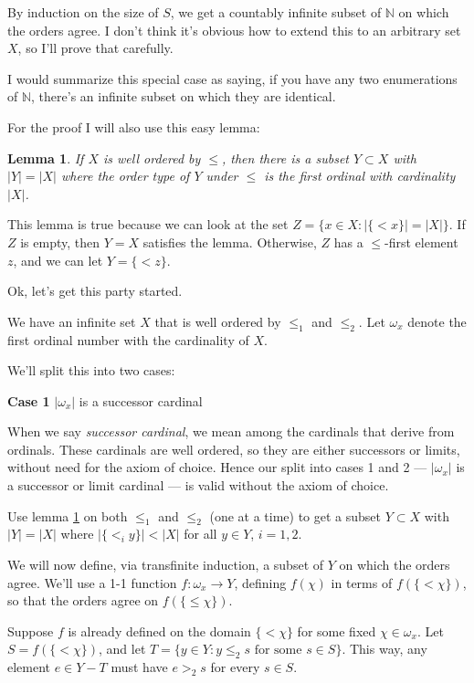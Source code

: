 \documentclass[11pt]{amsart}
\newtheorem{Lemma}[Def]{Lemma}
\newcommand\bpf[1][]{\smallskip\noindent{\bf Proof#1.}\quad}
\newcommand\N{\mathbb N}
\begin{document}
By induction on the size of $S$, we get a countably infinite subset of $\N$ on which the orders agree.
I don't think it's obvious how to extend this to an arbitrary set $X$, so I'll prove that carefully.

I would summarize this special case as saying, if you have any two enumerations of $\N$, there's
an infinite subset on which they are identical.

For the proof I will also use this easy lemma:

\begin{Lemma}\label{first_ordinal_lemma}
If $X$ is well ordered by $\le$, then there is a subset $Y\subset X$ with
$|Y| = |X|$ where the order type of $Y$ under $\le$ is the first ordinal
with cardinality $|X|$.
\end{Lemma}

This lemma is true because we can look at the set $Z = \{ x\in X : |\{ < x \}| = |X| \}$.
If $Z$ is empty, then $Y=X$ satisfies the lemma. Otherwise, $Z$ has a $\le$-first element $z$,
and we can let $Y = \{ < z \}$.

\bpf
Ok, let's get this party started.

We have an infinite set $X$ that is well ordered by $\le_1$ and $\le_2$.
Let $\omega_x$ denote the first ordinal number with the cardinality of $X$.

We'll split this into two cases:

{\bf Case 1 } $|\omega_x|$ is a successor cardinal

When we say {\em successor cardinal}, we mean among
the cardinals that derive from ordinals. These cardinals are
well ordered, so they are either successors or limits, without
need for the axiom of choice. Hence our split into cases 1 and 2 ---
$|\omega_x|$ is a successor or limit cardinal --- is valid without the axiom of choice.

Use lemma \ref{first_ordinal_lemma} on both $\le_1$ and $\le_2$ (one
at a time) to get a subset $Y \subset X$
with $|Y| = |X|$ where $|\{ <_i y \}| < |X|$ for all $y\in Y$, $i=1,2$.

We will now define, via transfinite induction, a subset of $Y$ on which the orders agree.
We'll use a 1-1 function $f : \omega_x \to Y$, defining $f(\chi)$ in terms
of $f( \{ < \chi \} )$, so that the orders agree on $f( \{ \le \chi \} )$.

Suppose $f$ is already defined on the domain $\{ < \chi \}$ for some fixed $\chi \in \omega_x$.
Let $S = f( \{ < \chi \} )$, and 
let $T = \{ y \in Y : y \le_2 s \text{ for some } s \in S \}$.
This way, any element $e \in Y - T$ must have $e >_2 s$ for every $s \in S$.
\end{document}
